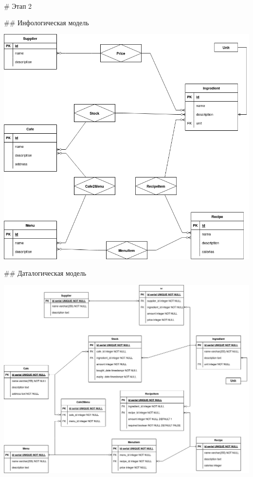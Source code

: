 \begin{markdown}
# Этап 2

## Инфологическая модель
\end{markdown}

\includegraphics[width=\linewidth]{fig/infological.png}

\begin{markdown}
## Даталогическая модель
\end{markdown}

\includegraphics[width=\linewidth]{fig/datalogical.png}
